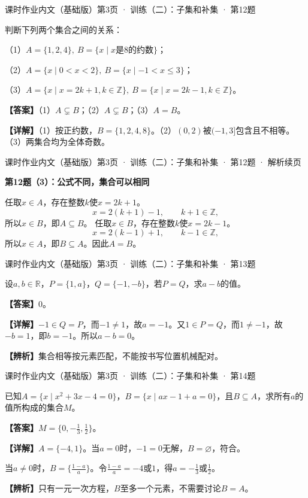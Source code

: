 \documentclass[UTF8,10pt,aspectratio=169]{ctexbeamer}
\newcommand{\Answer}[1]{\par\vspace{0.2cm}\textbf{【答案】}#1}
\newcommand{\Analysis}[1]{\par\vspace{0.2cm}\textbf{【详解】}#1}
\newcommand{\R}{\mathbb R}
\newcommand{\Z}{\mathbb Z}
\newcommand{\Tip}[1]{\par\vspace{0.2cm}\textbf{【辨析】}#1}
\newcommand{\Source}[1]{{\scriptsize\color{gray}#1}\par\vspace{0.25cm}}
\begin{document}
\begin{frame}
\Source{课时作业内文（基础版）第3页 · 训练（二）：子集和补集 · 第12题}
判断下列两个集合之间的关系：
\par （1）$A=\{1,2,4\},\ B=\{x\mid x\text{是}8\text{的约数}\}$；
\par （2）$A=\{x\mid0<x<2\},\ B=\{x\mid-1<x\le3\}$；
\par （3）$A=\{x\mid x=2k+1,k\in\Z\},\ B=\{x\mid x=2k-1,k\in\Z\}$。
\pause
\Answer{（1）$A\subsetneq B$；（2）$A\subsetneq B$；（3）$A=B$。}
\Analysis{（1）按正约数，$B=\{1,2,4,8\}$。（2）$(0,2)$被$(-1,3]$包含且不相等。（3）两集合均为全体奇数。}
\end{frame}
\begin{frame}
\Source{课时作业内文（基础版）第3页 · 训练（二）：子集和补集 · 第12题 · 解析续页}

\textbf{第12题（3）：公式不同，集合可以相同}
\par\vspace{0.3cm}
任取$x\in A$，存在整数$k$使$x=2k+1$。
\[x=2(k+1)-1,\qquad k+1\in\Z,\]
所以$x\in B$，即$A\subseteq B$。
\pause
任取$x\in B$，存在整数$k$使$x=2k-1$。
\[x=2(k-1)+1,\qquad k-1\in\Z,\]
所以$x\in A$，即$B\subseteq A$。因此$A=B$。

\end{frame}
\begin{frame}
\Source{课时作业内文（基础版）第3页 · 训练（二）：子集和补集 · 第13题}
设$a,b\in\R$，$P=\{1,a\}$，$Q=\{-1,-b\}$，若$P=Q$，求$a-b$的值。
\pause
\Answer{$0$。}
\Analysis{$-1\in Q=P$，而$-1\ne1$，故$a=-1$。又$1\in P=Q$，而$1\ne-1$，故$-b=1$，即$b=-1$。所以$a-b=0$。}
\Tip{集合相等按元素匹配，不能按书写位置机械配对。}
\end{frame}
\begin{frame}
\Source{课时作业内文（基础版）第3页 · 训练（二）：子集和补集 · 第14题}
已知$A=\{x\mid x^2+3x-4=0\}$，$B=\{x\mid ax-1+a=0\}$，且$B\subseteq A$，求所有$a$的值所构成的集合$M$。
\pause
\Answer{$M=\{0,-\frac13,\frac12\}$。}
\Analysis{$A=\{-4,1\}$。当$a=0$时，$-1=0$无解，$B=\varnothing$，符合。
\par 当$a\ne0$时，$B=\{\frac{1-a}{a}\}$。令$\frac{1-a}{a}=-4$或$1$，得$a=-\frac13$或$\frac12$。}
\Tip{只有一元一次方程，$B$至多一个元素，不需要讨论$B=A$。}
\end{frame}
\end{document}
